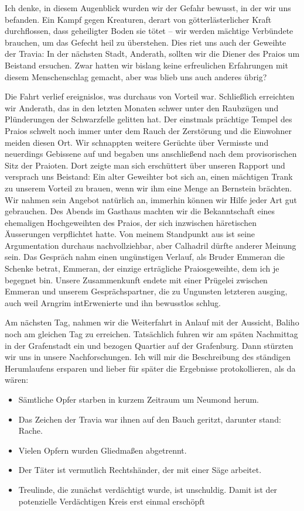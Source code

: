 Ich denke, in diesem Augenblick wurden wir der Gefahr bewusst, in der wir uns befanden. Ein Kampf gegen Kreaturen, derart von götterlästerlicher Kraft durchflossen, dass geheiligter Boden sie tötet -- wir werden mächtige Verbündete brauchen, um das Gefecht heil zu überstehen. Dies riet uns auch der Geweihte der Travia: In der nächsten Stadt, Anderath, sollten wir die Diener des Praios um Beistand ersuchen. Zwar hatten wir bislang keine erfreulichen Erfahrungen mit diesem Menschenschlag gemacht, aber was blieb uns auch anderes übrig?


Die Fahrt verlief ereignislos, was durchaus von Vorteil war. Schließlich erreichten wir Anderath, das in den letzten Monaten schwer unter den Raubzügen und Plünderungen der Schwarzfelle gelitten hat. Der einstmals prächtige Tempel des Praios schwelt noch immer unter dem Rauch der Zerstörung und die Einwohner meiden diesen Ort. Wir schnappten weitere Gerüchte über Vermisste und neuerdings Gebissene auf und begaben uns anschließend nach dem provisorischen Sitz der Praioten. Dort zeigte man sich erschüttert über unseren Rapport und versprach uns Beistand: Ein alter Geweihter bot sich an, einen mächtigen Trank zu unserem Vorteil zu brauen, wenn wir ihm eine Menge an Bernstein brächten. Wir nahmen sein Angebot natürlich an, immerhin können wir Hilfe jeder Art gut gebrauchen. Des Abends im Gasthaus machten wir die Bekanntschaft eines ehemaligen Hochgeweihten des Praios, der sich inzwischen häretischen Äusserungen verpflichtet hatte. Von meinem Standpunkt aus ist seine Argumentation durchaus nachvollziehbar, aber Calhadril dürfte anderer Meinung sein. Das Gespräch nahm einen ungünstigen Verlauf, als Bruder Emmeran die Schenke betrat, Emmeran, der einzige erträgliche Praiosgeweihte, dem ich je begegnet bin. Unsere Zusammenkunft endete mit einer Prügelei zwischen Emmeran und unserem Gesprächspartner, die zu Ungunsten letzteren ausging, auch weil Arngrim intErwenierte und ihn bewusstlos schlug.


Am nächsten Tag, nahmen wir die Weiterfahrt in Anlauf mit der Aussicht, Baliho noch am gleichen Tag zu erreichen. Tatsächlich fuhren wir am späten Nachmittag in der Grafenstadt ein und bezogen Quartier auf der Grafenburg. Dann stürzten wir uns in unsere Nachforschungen. Ich will mir die Beschreibung des ständigen Herumlaufens ersparen und lieber für später die Ergebnisse protokollieren, als da wären:

\begin{itemize}
\item Sämtliche Opfer starben in kurzem Zeitraum um Neumond herum.
\item Das Zeichen der Travia war ihnen auf den Bauch geritzt, darunter stand: Rache.
\item Vielen Opfern wurden Gliedmaßen abgetrennt.
\item Der Täter ist vermutlich Rechtshänder, der mit einer Säge arbeitet.
\item Treulinde, die zunächst verdächtigt wurde, ist unschuldig. Damit ist der potenzielle Verdächtigen Kreis erst einmal erschöpft
\end{itemize}


